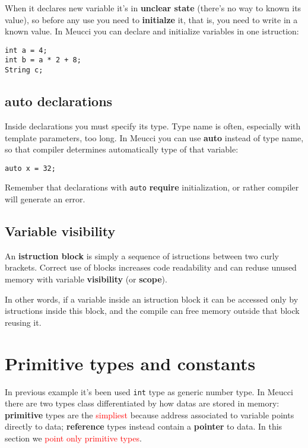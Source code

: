 \documentclass[10pt]{book}%
\newcommand{\err}[1]{\textcolor{red}{#1}}
\newcommand{\code}[1]{\texttt{#1}}
\renewcommand{\emph}[1]{\textbf{#1}}
\newenvironment{codeenv}{
\begin{mdframed}[backgroundcolor=black!20,topline=false,leftline=false,rightline=false,bottomline=false]
}
{\end{mdframed}}
\begin{document}
When it declares new variable it's in \emph{unclear state} (there's no way to known its value), so before any use you need to \emph{initialze} it, that is, you need to write in a known value. In Meucci you can declare and initialize variables in one istruction:
\begin{codeenv}
\begin{verbatim}
int a = 4;
int b = a * 2 + 8;
String c;
\end{verbatim}
\end{codeenv}

\subsection{auto declarations}
Inside declarations you must specify its type. Type name is often, especially with template parameters, too long. In Meucci you can use \emph{auto} instead of type name, so that compiler determines automatically type of that variable:
\begin{codeenv}
\begin{verbatim}
auto x = 32;
\end{verbatim}
\end{codeenv}
Remember that declarations with \code{auto} \emph{require} initialization, or rather compiler will generate an error.

\subsection{Variable visibility}
An \emph{istruction block} is simply a sequence of istructions between two curly brackets. Correct use of blocks increases code readability and can reduse unused memory with variable \emph{visibility} (or \emph{scope}).

In other words, if a variable inside an istruction block it can be accessed only by istructions inside this block, and the compile can free memory outside that block reusing it.

\section{Primitive types and constants}
In previous example it's been used \code{int} type as generic number type. In Meucci there are two types class differentiated by how datas are stored in memory: \emph{primitive} types are the \err{simpliest} because address associated to variable points directly to data; \emph{reference} types instead contain a \emph{pointer} to data. In this section we \err{point only primitive types}.
\end{document}
